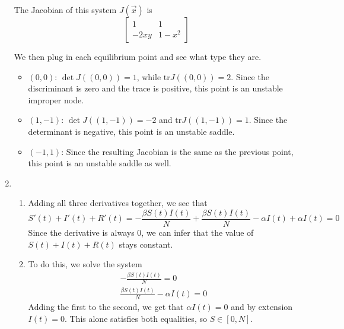 \documentclass[12pt]{article}
\begin{document}
\begin{enumerate}
          The Jacobian of this system $J(\vec{x})$ is
          \[\begin{bmatrix}
                  1    & 1     \\
                  -2xy & 1-x^2
              \end{bmatrix}\]

          We then plug in each equilibrium point and see what type they are.
          \begin{itemize}
              \item $(0, 0)$: $\det J((0, 0)) = 1$, while $\text{tr} J((0, 0))=2$.
                    Since the discriminant is zero and the trace is positive, this point is an unstable improper node.
              \item $(1, -1)$: $\det J((1, -1))=-2$ and $\text{tr} J((1, -1)) = 1$.
                    Since the determinant is negative, this point is an unstable saddle.
              \item $(-1, 1)$: Since the resulting Jacobian is the same as the previous point,
                    this point is an unstable saddle as well.
          \end{itemize}
    \item \begin{enumerate}
              \item Adding all three derivatives together, we see that
                    \[S'(t)+I'(t)+R'(t)=-\frac{\beta S(t)I(t)}{N}+\frac{\beta S(t)I(t)}{N}-\alpha I(t)+\alpha I(t)=0\]
                    Since the derivative is always $0$, we can infer that the value of $S(t)+I(t)+R(t)$ stays constant.
              \item To do this, we solve the system
                    \begin{gather*}
                        -\frac{\beta S(t) I(t)}{ N} = 0 \\
                        \frac{\beta S(t) I(t)}{ N} - \alpha I(t) = 0
                    \end{gather*}
                    Adding the first to the second, we get that $\alpha I(t)=0$ and by extension $I(t)=0$.
                    This alone satisfies both equalities, so $S \in [0, N]$.


\end{enumerate}
\end{enumerate}
\end{document}
